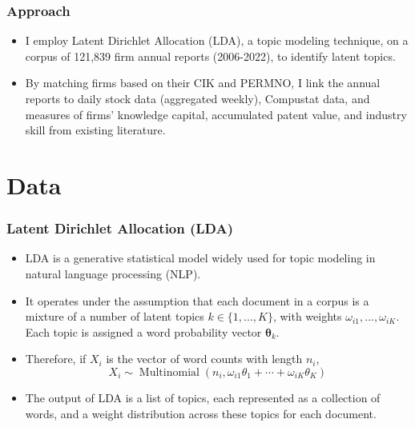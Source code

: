 \documentclass{beamer}
\begin{document}
\begin{frame}
\frametitle{Approach}
\begin{itemize}
\item I employ Latent Dirichlet Allocation (LDA), a topic modeling technique, on a corpus of 121,839 firm annual reports (2006-2022), to identify latent topics.
\item By matching firms based on their CIK and PERMNO, I link the annual reports to daily stock data (aggregated weekly), Compustat data, and measures of firms' knowledge capital, accumulated patent value, and industry skill from existing literature.
\end{itemize}

\end{frame}

\section{Data}


\begin{frame}
\frametitle{Latent Dirichlet Allocation (LDA)}
\begin{itemize}
\small
\item LDA is a generative statistical model widely used for topic modeling in natural language processing (NLP).
\item It operates under the assumption that each document in a corpus is a mixture of a number of latent topics $k \in \{1, ..., K\}$, with weights $\omega_{i1}, ..., \omega_{iK}$. Each topic is assigned a word probability vector $\mathbf{\theta}_k$. 
\item Therefore, if $X_i$ is the vector of word counts with length $n_i$, 
\begin{equation}
X_i \sim \operatorname{Multinomial}\left(n_i, \omega_{i 1} \theta_1+\cdots+\omega_{i K} \theta_K\right)
\end{equation}
\item The output of LDA is a list of topics, each represented as a collection of words, and a weight distribution across these topics for each document.
\end{itemize}
\end{frame}
\end{document}
